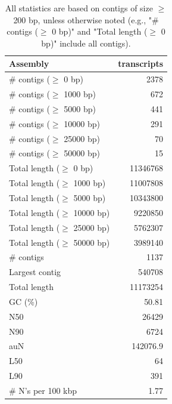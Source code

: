 \documentclass[12pt,a4paper]{article}
\begin{document}
\begin{table}[ht]
\begin{center}
\caption{All statistics are based on contigs of size $\geq$ 200 bp, unless otherwise noted (e.g., "\# contigs ($\geq$ 0 bp)" and "Total length ($\geq$ 0 bp)" include all contigs).}
\begin{tabular}{|l*{1}{|r}|}
\hline
Assembly & transcripts \\ \hline
\# contigs ($\geq$ 0 bp) & 2378 \\ \hline
\# contigs ($\geq$ 1000 bp) & 672 \\ \hline
\# contigs ($\geq$ 5000 bp) & 441 \\ \hline
\# contigs ($\geq$ 10000 bp) & 291 \\ \hline
\# contigs ($\geq$ 25000 bp) & 70 \\ \hline
\# contigs ($\geq$ 50000 bp) & 15 \\ \hline
Total length ($\geq$ 0 bp) & 11346768 \\ \hline
Total length ($\geq$ 1000 bp) & 11007808 \\ \hline
Total length ($\geq$ 5000 bp) & 10343800 \\ \hline
Total length ($\geq$ 10000 bp) & 9220850 \\ \hline
Total length ($\geq$ 25000 bp) & 5762307 \\ \hline
Total length ($\geq$ 50000 bp) & 3989140 \\ \hline
\# contigs & 1137 \\ \hline
Largest contig & 540708 \\ \hline
Total length & 11173254 \\ \hline
GC (\%) & 50.81 \\ \hline
N50 & 26429 \\ \hline
N90 & 6724 \\ \hline
auN & 142076.9 \\ \hline
L50 & 64 \\ \hline
L90 & 391 \\ \hline
\# N's per 100 kbp & 1.77 \\ \hline
\end{tabular}
\end{center}
\end{table}
\end{document}
